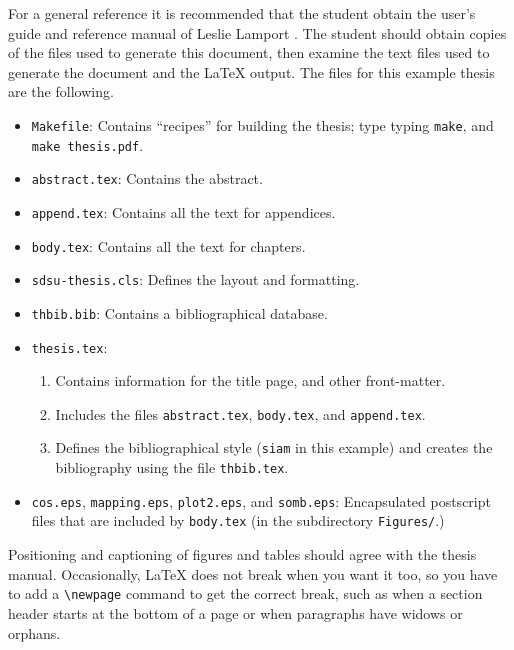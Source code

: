 For a general reference it is recommended that the student obtain the
user's guide and reference manual of Leslie Lamport \cite{LAM}. The
student should obtain copies of the files used to generate this
document, then examine the text files used to generate the document
and the \LaTeX{} output.  The files for this example thesis are the
following.
\begin{itemize}
\item \verb+Makefile+: Contains ``recipes'' for building the thesis;
  type typing \verb+make+, and \verb+make thesis.pdf+.
\item \verb+abstract.tex+: Contains the abstract.
\item \verb+append.tex+: Contains all the text for appendices.
\item \verb+body.tex+: Contains all the text for chapters. 
\item \verb+sdsu-thesis.cls+: Defines the layout and formatting.
\item \verb+thbib.bib+:  Contains a bibliographical database.
\item \verb+thesis.tex+: 
  \begin{enumerate}
  \item  Contains information for the title page, and other
    front-matter.
  \item Includes the files \verb+abstract.tex+,  \verb+body.tex+, and
    \verb+append.tex+. 
  \item Defines the bibliographical style (\verb+siam+ in this
    example) and creates the bibliography using the file
    \verb+thbib.tex+.
  \end{enumerate}
\item \verb+cos.eps+, \verb+mapping.eps+, \verb+plot2.eps+, and
  \verb+somb.eps+: Encapsulated postscript files that are included by
  \verb+body.tex+ (in the subdirectory \verb+Figures/+.)
\end{itemize}

Positioning and captioning of figures and tables should agree with the
thesis manual.  Occasionally, \LaTeX{} does not break when you want it
too, so you have to add a \verb+\newpage+ command to get
the correct break, such as when a section header starts at the bottom
of a page or when paragraphs have widows or orphans.


